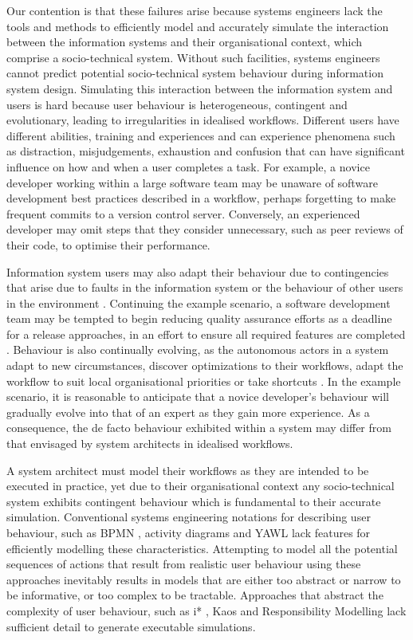 \documentclass{llncs}
\begin{document}
Our contention is that these failures arise because systems engineers lack the tools and methods to efficiently model
and accurately simulate the interaction between the information systems and their organisational context, which comprise
a socio-technical system. Without such facilities, systems engineers cannot predict potential socio-technical system
behaviour during information system design. Simulating this interaction between the information system and users is
hard because user behaviour is heterogeneous, contingent and evolutionary, leading to irregularities in idealised
workflows.  Different users have different abilities, training and experiences and can experience phenomena such as
distraction, misjudgements, exhaustion and confusion that can have significant influence on how and when a user completes
a task.  For example, a novice developer working within a large software team may be unaware of software development best
practices described in a workflow, perhaps forgetting to make frequent commits to a version control server.  Conversely,
an experienced developer may omit steps that they consider unnecessary, such as peer reviews of their code, to optimise their
performance.

Information system users may also adapt their behaviour due to contingencies that arise due to faults in the information
system or the behaviour of other users in the environment \citep{sommerville09deriving}.  Continuing the example scenario, a
software development team may be tempted to begin reducing quality assurance efforts as a deadline for a release approaches, in an
effort to ensure all required features are completed \citep{beck02test}. Behaviour is also continually evolving, as the
autonomous actors in a system adapt to new circumstances, discover optimizations to their workflows, adapt the workflow
to suit local organisational priorities or take shortcuts \citep{bonen79evolutionary}.  In the example scenario, it is
reasonable to anticipate that a novice developer's behaviour will gradually evolve into that of an expert as they gain
more experience.  As a consequence, the de facto behaviour exhibited within a system may differ from that envisaged by
system architects in idealised workflows.

A system architect must model their workflows as they are intended to be executed in practice, yet due to their
organisational context any socio-technical system exhibits contingent behaviour which is fundamental to their accurate
simulation. Conventional systems engineering notations for describing user behaviour, such as BPMN \citep{omg2011omgbpmn},
activity diagrams \citep{omg07omguml} and YAWL \citep{hofstede2010yawl} lack features for efficiently modelling these
characteristics.  Attempting to model all the potential sequences of actions that result from realistic user behaviour using these
approaches inevitably results in models that are either too abstract or narrow to be informative, or too complex to be
tractable.  Approaches that abstract the complexity of user behaviour, such as i* \citep{yu1995social},
Kaos \citep{werneck2009goreistarkaos} and Responsibility Modelling \citep{sommerville09deriving} lack sufficient detail to
generate executable simulations.  
\end{document}
